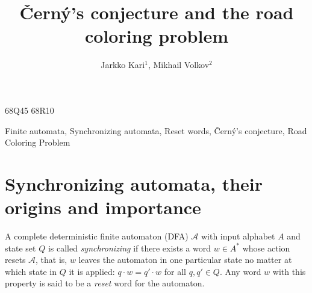 \documentclass{irmaart}
\newcounter{hours}\newcounter{minutes}
\newcommand\printtime{\setcounter{hours}{\time/60}%
  \setcounter{minutes}{\time-\value{hours}*60}%
  \thehours\,h\,\theminutes}
\newcommand\dateandtime{\today\quad\printtime}
\begin{document}

\title{\v{C}ern\'{y}'s conjecture and the road coloring problem}
\author{Jarkko Kari$^1$,
  Mikhail Volkov$^2$}
\address{$^1$Department of Mathematics\\
FI-20014 University of Turku\\
Turku, Finland\\[2mm]
$^2$Department of Mathematics and Mechanics\\
620083 Ural State University\\
Ekaterinburg, Russia\\
email:\,\url{jkari@utu.fi,Mikhail.Volkov@usu.ru}\\[4mm]
\upshape{\dateandtime}}

\maketitle\label{chapterKV}

\begin{classification}
  68Q45 68R10
\end{classification}

\begin{keywords}
  Finite automata, Synchronizing automata, Reset words, \v{C}ern\'{y}'s conjecture,
  Road Coloring Problem
\end{keywords}



%
\localtableofcontents

\section{Synchronizing automata, their origins and importance}
A complete deterministic finite automaton (DFA) $\mathcal{A}$
with input alphabet $A$ and state set $Q$ is called
\emph{synchronizing} if there
exists a word $w\in A^*$ whose action resets $\mathcal{A}$, that
is, $w$ leaves the automaton in one particular state no matter
at which state in $Q$ it is applied: $q\cdot w=q'\cdot w$ for all
$q,q'\in Q$. Any word $w$ with this property is said to be a
\emph{reset} word for the automaton.
\end{document}
